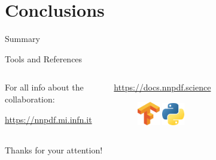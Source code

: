 \documentclass[9pt]{beamer}
\begin{document}
\section{Conclusions}

\begin{frame}{Summary}
\end{frame}

\begin{frame}{Tools and References}
    \begin{columns}
        \begin{column}{0.5\textwidth}
            For all info about the collaboration:

            \url{https://nnpdf.mi.infn.it}
        \end{column}
        \begin{column}{0.5\textwidth}


            \url{https://docs.nnpdf.science}

            \begin{figure}
                \centering
                \includegraphics[width=0.15\textwidth]{tensorflow}
                \hspace*{0.25\textwidth}
                \includegraphics[width=0.15\textwidth]{python}
            \end{figure}
        \end{column}
    \end{columns}
\end{frame}

\begin{frame}[standout]
    Thanks for your attention!
\end{frame}

\appendix
\end{document}
